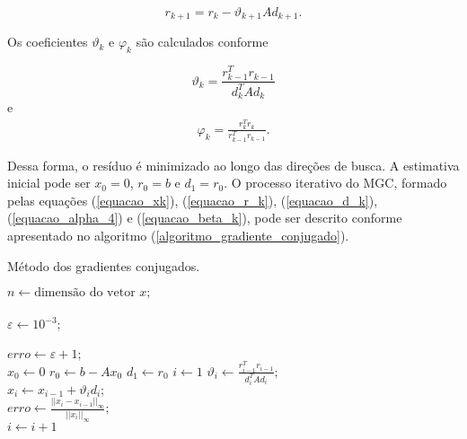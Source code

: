 \begin{equation}
r_{k+1} = r_{k} - \vartheta_{k+1} A d_{k+1}.
\label{equacao_r_k}
\end{equation}

Os coeficientes $\vartheta_k$ e $\varphi_{k}$ são calculados conforme

\begin{equation}
  \vartheta_k =  \frac {r_{k-1}^T r_{k-1}} {d^{T}_k A d_k}
\label{equacao_alpha_4}
\end{equation}
e
\begin{eqnarray}
 \varphi_{k} = \frac{r_{k}^T r_{k}} {r_{k-1}^T r_{k-1}}.
\label{equacao_beta_k}
\end{eqnarray}

Dessa forma, o resíduo é minimizado ao longo das direções de busca. A estimativa inicial pode ser $x_0 = 0$, $r_0 = b$ e $d_1 = r_0$. O processo iterativo do MGC, formado pelas equações (\ref{equacao_xk}), (\ref{equacao_r_k}), (\ref{equacao_d_k}), (\ref{equacao_alpha_4}) e (\ref{equacao_beta_k}), pode ser descrito conforme apresentado no algoritmo (\ref{algoritmo_gradiente_conjugado}).

\begin{algorithm}
\caption{Método dos gradientes conjugados.}
\label{algoritmo_gradiente_conjugado}
$n \leftarrow \textrm {dimensão do vetor } x;$\\
\\
$\varepsilon \leftarrow 10^{-3};$ \\
\\
$erro \leftarrow \varepsilon + 1;$ \\
$x_0 \leftarrow 0$\; 
$r_0 \leftarrow b - Ax_0$\;
$d_1 \leftarrow r_0$\;       
$i \leftarrow 1$\;
 { 
 $ \vartheta_{i} \leftarrow \frac{r^T_{i-1} r_{i-1}}{d^T_{i} A d_{i}};$  \\
 $ x_{i} \leftarrow x_{i-1} + \vartheta_{i} d_{i};$ \\
 $erro \leftarrow \frac { || x_i - x_{i-1} ||_\infty } { ||x_i||_\infty};$  \\
 $i \leftarrow i + 1$\;
}
\end{algorithm}

